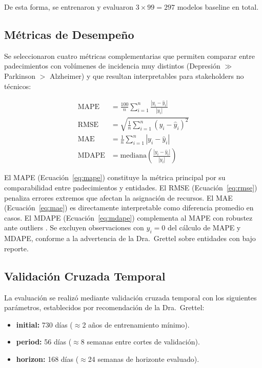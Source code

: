 \documentclass[11pt,a4paper]{article}
\begin{document}
De esta forma, se entrenaron y evaluaron $3 \times 99 = 297$ modelos baseline en total.

\subsection{Métricas de Desempeño}\label{sec:metricas}

Se seleccionaron cuatro métricas complementarias que permiten comparar entre padecimientos con volúmenes de incidencia muy distintos (Depresión $\gg$ Parkinson $>$ Alzheimer) y que resultan interpretables para stakeholders no técnicos:

\begin{align}
\text{MAPE} &= \frac{100}{n}\sum_{i=1}^{n}\frac{|y_i - \hat{y}_i|}{|y_i|} \label{eq:mape} \\[6pt]
\text{RMSE} &= \sqrt{\frac{1}{n}\sum_{i=1}^{n}(y_i - \hat{y}_i)^2} \label{eq:rmse} \\[6pt]
\text{MAE} &= \frac{1}{n}\sum_{i=1}^{n}|y_i - \hat{y}_i| \label{eq:mae} \\[6pt]
\text{MDAPE} &= \text{mediana}\left(\frac{|y_i - \hat{y}_i|}{|y_i|}\right) \label{eq:mdape}
\end{align}

El MAPE (Ecuación~\ref{eq:mape}) constituye la métrica principal por su comparabilidad entre padecimientos y entidades. El RMSE (Ecuación~\ref{eq:rmse}) penaliza errores extremos que afectan la asignación de recursos. El MAE (Ecuación~\ref{eq:mae}) es directamente interpretable como diferencia promedio en casos. El MDAPE (Ecuación~\ref{eq:mdape}) complementa al MAPE con robustez ante outliers \citep{hyndman2006another}. Se excluyen observaciones con $y_i = 0$ del cálculo de MAPE y MDAPE, conforme a la advertencia de la Dra.\ Grettel sobre entidades con bajo reporte.

\subsection{Validación Cruzada Temporal}\label{sec:cv}

La evaluación se realizó mediante validación cruzada temporal \citep{bergmeir2012use} con los siguientes parámetros, establecidos por recomendación de la Dra.\ Grettel:

\begin{itemize}[nosep]
    \item \textbf{initial:} 730 días ($\approx$2 años de entrenamiento mínimo).
    \item \textbf{period:} 56 días ($\approx$8 semanas entre cortes de validación).
    \item \textbf{horizon:} 168 días ($\approx$24 semanas de horizonte evaluado).
\end{itemize}
\end{document}

